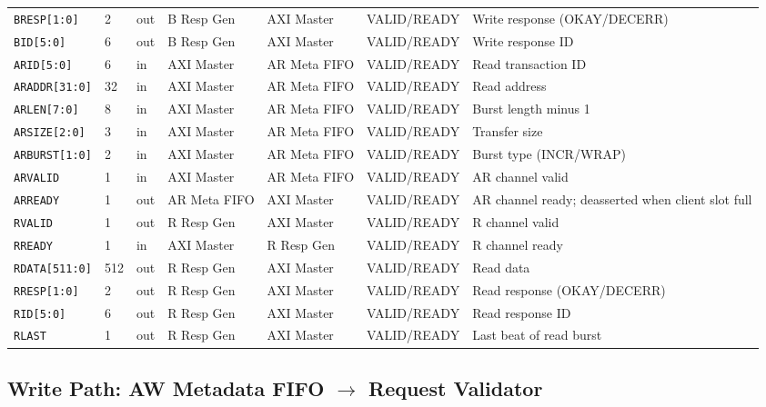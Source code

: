 \begin{landscape}
\begin{tabularx}{\linewidth}{L{3.0cm} C{0.8cm} C{1.0cm} L{2.2cm} L{2.2cm} L{3.4cm} X}
\texttt{BRESP[1:0]}    & 2   & out & B Resp Gen  & AXI Master  & VALID/READY & Write response (OKAY/DECERR) \\
\texttt{BID[5:0]}      & 6   & out & B Resp Gen  & AXI Master  & VALID/READY & Write response ID \\
\midrule
\texttt{ARID[5:0]}     & 6   & in  & AXI Master & AR Meta FIFO & VALID/READY & Read transaction ID \\
\texttt{ARADDR[31:0]}  & 32  & in  & AXI Master & AR Meta FIFO & VALID/READY & Read address \\
\texttt{ARLEN[7:0]}    & 8   & in  & AXI Master & AR Meta FIFO & VALID/READY & Burst length minus 1 \\
\texttt{ARSIZE[2:0]}   & 3   & in  & AXI Master & AR Meta FIFO & VALID/READY & Transfer size \\
\texttt{ARBURST[1:0]}  & 2   & in  & AXI Master & AR Meta FIFO & VALID/READY & Burst type (INCR/WRAP) \\
\texttt{ARVALID}       & 1   & in  & AXI Master & AR Meta FIFO & VALID/READY & AR channel valid \\
\texttt{ARREADY}       & 1   & out & AR Meta FIFO & AXI Master & VALID/READY & AR channel ready; deasserted when client slot full \\
\midrule
\texttt{RVALID}        & 1   & out & R Resp Gen  & AXI Master  & VALID/READY & R channel valid \\
\texttt{RREADY}        & 1   & in  & AXI Master  & R Resp Gen  & VALID/READY & R channel ready \\
\texttt{RDATA[511:0]}  & 512 & out & R Resp Gen  & AXI Master  & VALID/READY & Read data \\
\texttt{RRESP[1:0]}    & 2   & out & R Resp Gen  & AXI Master  & VALID/READY & Read response (OKAY/DECERR) \\
\texttt{RID[5:0]}      & 6   & out & R Resp Gen  & AXI Master  & VALID/READY & Read response ID \\
\texttt{RLAST}         & 1   & out & R Resp Gen  & AXI Master  & VALID/READY & Last beat of read burst \\
\bottomrule
\end{tabularx}

\subsection{Write Path: AW Metadata FIFO $\rightarrow$ Request Validator}


\end{landscape}

